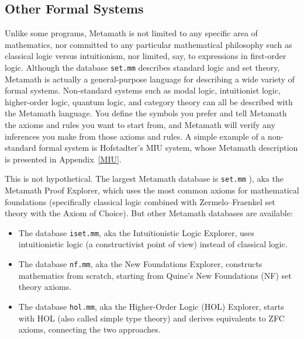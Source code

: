 \subsection{Other Formal Systems}

Unlike some programs, Metamath is not limited to any specific
area of mathematics, nor committed to any particular mathematical philosophy
such as classical logic versus intuitionism, nor limited, say, to expressions
in first-order logic.  Although the database \texttt{set.mm}
describes standard logic and set theory, Meta\-math
is actually a general-purpose language for describing a wide variety of formal
systems.  Non-standard systems such as modal
logic, intuitionist logic, higher-order
logic, quantum logic, and
category theory can all be described with the Metamath
language.  You define the symbols you prefer and tell Metamath the axioms and
rules you want to start from, and Metamath will verify any inferences you make
from those axioms and rules.  A simple example of a non-standard formal system
is Hofstadter's MIU system,
whose Metamath description is presented in Appendix~\ref{MIU}.

This is not hypothetical.
The largest Metamath database is
\texttt{set.mm}%
), aka the Metamath Proof Explorer,
which uses the most common axioms for mathematical foundations
(specifically classical logic combined with Zermelo--Fraenkel
set theory with the Axiom of Choice).
But other Metamath databases are available:

\begin{itemize}
\item The database
  \texttt{iset.mm},
  aka the
  Intuitionistic Logic Explorer,
  uses intuitionistic logic (a constructivist point of view)
  instead of classical logic.
\item The database
  \texttt{nf.mm},
  aka the
  New Foundations Explorer,
  constructs mathematics from scratch,
  starting from Quine's New Foundations (NF) set theory axioms.
\item The database
  \texttt{hol.mm},
  aka the
  Higher-Order Logic (HOL) Explorer,
  starts with HOL (also called simple type theory) and derives
  equivalents to ZFC axioms, connecting the two approaches.
\end{itemize}

